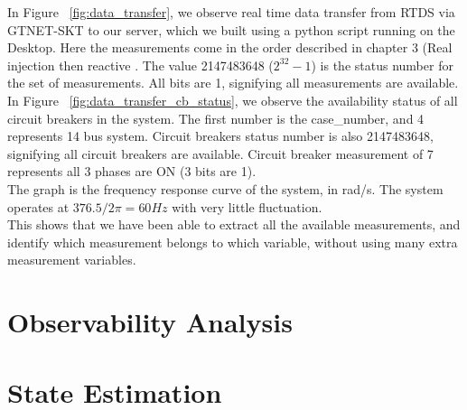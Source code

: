 In Figure ~\ref{fig:data_transfer}, we observe real time data transfer from RTDS via GTNET-SKT to our server, which we built using a python script running on the Desktop. Here the measurements come in the order described in chapter 3 (Real injection then reactive . The value 2147483648 ($2^{32}-1$) is the status number for the set of measurements. All bits are 1, signifying all measurements are available. In Figure ~\ref{fig:data_transfer_cb_status}, we observe the availability status of all circuit breakers in the system. The first number is the case\_number, and 4 represents 14 bus system. Circuit breakers status number is also 2147483648, signifying all circuit breakers are available. Circuit breaker measurement of 7 represents all 3 phases are ON (3 bits are 1).\\
The graph is the frequency response curve of the system, in rad/s. The system operates at $376.5/2 \pi=60Hz$ with very little fluctuation.\\

This shows that we have been able to extract all the available measurements, and identify which measurement belongs to which variable, without using many extra measurement variables.

\section{Observability Analysis}


\section{State Estimation}

